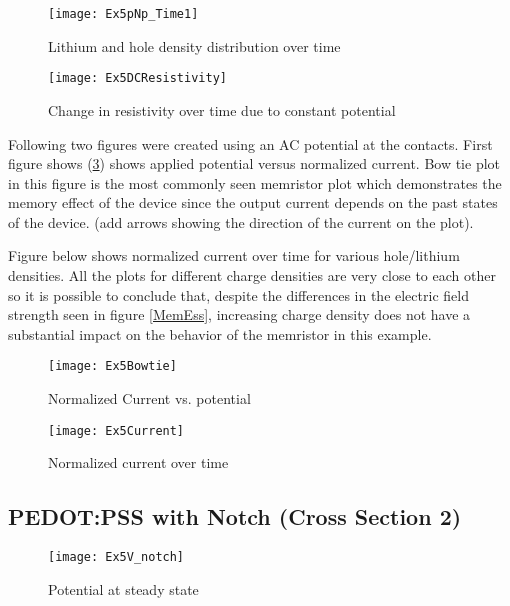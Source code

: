 \begin{landscape}
\begin{figure}[!htp]
\centering
\texttt{[image: Ex5pNp\_Time1]}
\caption{Lithium and hole density distribution over time} 
\label{MempLi}
\end{figure}
\end{landscape}

\begin{figure}[!htp]
\centering
\texttt{[image: Ex5DCResistivity]}
\caption{Change in resistivity over time due to constant potential} 
\label{MemRes}
\end{figure}


Following two figures were created using an AC potential at the contacts. First figure shows (\ref{Bowtie}) shows applied potential versus normalized current. Bow tie plot in this figure is the most commonly seen memristor plot which demonstrates the memory effect of the device since the output current depends on the past states of the device. (add arrows showing the direction of the current on the plot). 

Figure below shows normalized current over time for various hole/lithium densities. All the plots for different charge densities are very close to each other so it is possible to conclude that, despite the differences in the electric field strength seen in figure \ref{MemEss}, increasing charge density does not have a substantial impact on the behavior of the memristor in this example.

\begin{figure}[!htp]
\centering
\texttt{[image: Ex5Bowtie]}
\caption{Normalized Current vs. potential} 
\label{Bowtie}
\end{figure}
   
   
\begin{figure}[!htp]
\centering
\texttt{[image: Ex5Current]}
\caption{Normalized current over time} 
\label{}
\end{figure}



\clearpage
\subsection{PEDOT:PSS with Notch (Cross Section 2)}

\begin{figure}[!htp]
\centering
\texttt{[image: Ex5V\_notch]}
\caption{Potential at steady state} 
\label{MemVss_notch}
\end{figure}


